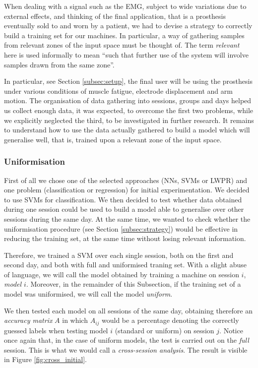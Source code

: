 When dealing with a signal such as the EMG, subject to wide variations
due to external effects, and thinking of the final application, that
is a prosthesis eventually sold to and worn by a patient, we had to
devise a strategy to correctly build a training set for our
machines. In particular, a way of gathering samples from relevant
zones of the input space must be thought of. The term \emph{relevant}
here is used informally to mean ``such that further use of the system
will involve samples drawn from the same zone''.

In particular, see Section \ref{subsec:setup}, the final user will be
using the prosthesis under various conditions of muscle fatigue,
electrode displacement and arm motion. The organisation of data
gathering into sessions, groups and days helped us collect enough
data, it was expected, to overcome the first two problems, while we
explicitly neglected the third, to be investigated in further
research. It remains to understand how to use the data actually
gathered to build a model which will generalise well, that is, trained
upon a relevant zone of the input space.

\subsubsection{Uniformisation}

First of all we chose one of the selected approaches (NNs, SVMs or
LWPR) and one problem (classification or regression) for initial
experimentation. We decided to use SVMs for classification. We then
decided to test whether data obtained during one session could be used
to build a model able to generalise over other sessions during the
same day. At the same time, we wanted to check whether the
uniformisation procedure (see Section \ref{subsec:strategy}) would be
effective in reducing the training set, at the same time without
losing relevant information.

Therefore, we trained a SVM over each single session, both on the
first and second day, and both with full and uniformised traning
set. With a slight abuse of language, we will call the model obtained
by training a machine on session $i$, \emph{model $i$}. Moreover, in
the remainder of this Subsection, if the training set of a model was
uniformised, we will call the model \emph{uniform}.

We then tested each model on all sessions of the same day, obtaining
therefore an \emph{accuracy matrix} $A$ in which $A_{ij}$ would be a
percentage denoting the correctly guessed labels when testing model
$i$ (standard or uniform) on session $j$. Notice once again that, in
the case of uniform models, the test is carried out on the \emph{full}
session. This is what we would call a \emph{cross-session analysis}.
The result is visible in Figure \ref{fig:cross_initial}.

